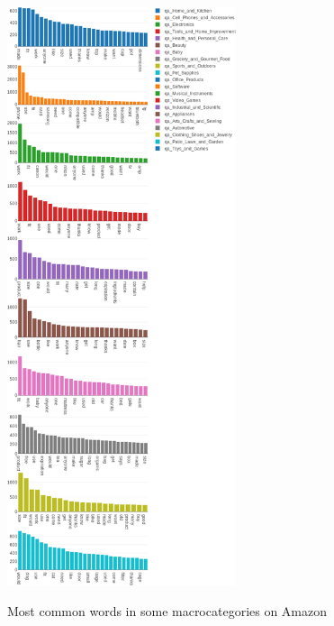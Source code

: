 \documentclass[LaM,oneside,binding=0.6cm]{sapthesis}
\begin{document}
\begin{figure}
\centering
\includegraphics[width=0.6\textwidth]{pictures/words0.png}\\[3ex]
\caption{Most common words in some macrocategories on Amazon}
\label{fig:chunktree}
\end{figure}
\end{document}
